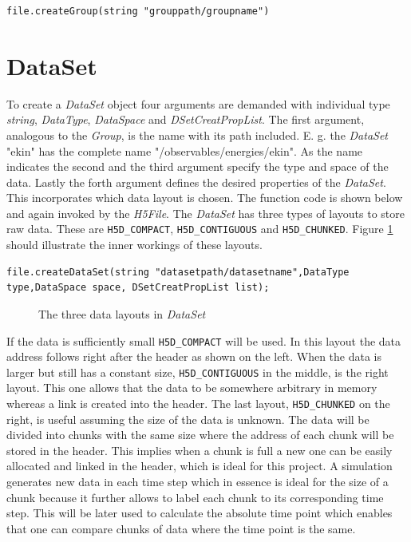 \begin{lstlisting}
file.createGroup(string "grouppath/groupname")
\end{lstlisting}

\section{DataSet}
\label{seq:dataset}
To create a \textit{DataSet} object four arguments are demanded with individual type \textit{string}, \textit{DataType}, \textit{DataSpace} and \textit{DSetCreatPropList}. The first argument, analogous to the \textit{Group}, is the name with its path included. E. g. the \textit{DataSet} "ekin" has the complete name "/observables/energies/ekin". As the name indicates the second and the third argument specify the type and space of the data. Lastly the forth argument defines the desired properties of the \textit{DataSet}. This incorporates which data layout is chosen. The function code is shown below and again invoked by the \textit{H5File}. The \textit{DataSet} has three types of layouts to store raw data. These are \texttt{H5D\_COMPACT}, \texttt{H5D\_CONTIGUOUS} and \texttt{H5D\_CHUNKED}. Figure \ref{fig:datalayout} should illustrate the inner workings of these layouts.

\begin{lstlisting}
file.createDataSet(string "datasetpath/datasetname",DataType type,DataSpace space, DSetCreatPropList list);
\end{lstlisting}

\begin{figure}[ht!]
\caption{The three data layouts in \textit{DataSet}}
\label{fig:datalayout}
\end{figure}

If the data is sufficiently small \texttt{H5D\_COMPACT} will be used. In this layout the data address follows right after the header as shown on the left. When the data is larger but still has a constant size, \texttt{H5D\_CONTIGUOUS} in the middle, is the right layout. This one allows that the data to be somewhere arbitrary in memory whereas a link is created into the header. The last layout, \texttt{H5D\_CHUNKED} on the right, is useful assuming the size of the data is unknown. The data will be divided into chunks with the same size where the address of each chunk will be stored in the header. This implies when a chunk is full a new one can be easily allocated and linked in the header, which is ideal for this project. A simulation generates new data in each time step which in essence is ideal for the size of a chunk because it further allows to label each chunk to its corresponding time step. This will be later used to calculate the absolute time point which enables that one can compare chunks of data where the time point is the same.


